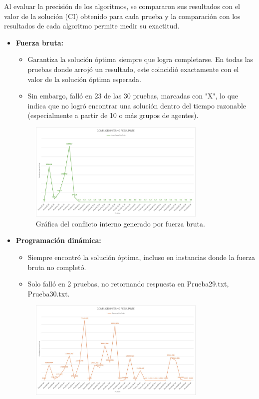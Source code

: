 \documentclass[11pt,letter]{article}
\begin{document}
    Al evaluar la precisión de los algoritmos, se compararon sus resultados con el valor de la solución (CI) obtenido para cada prueba y la comparación con los resultados de cada algoritmo permite medir su exactitud.

    \begin{itemize}
        \item \textbf{Fuerza bruta:}
        \begin{itemize}
            \item Garantiza la solución óptima siempre que logra completarse. En todas las pruebas donde arrojó un resultado, este coincidió exactamente con el valor de la solución óptima esperada.
            \item Sin embargo, falló en 23 de las 30 pruebas, marcadas con "X", lo que indica que no logró encontrar una solución dentro del tiempo razonable (especialmente a partir de 10 o más grupos de agentes).
        \end{itemize}
        \begin{figure}[H]
            \centering
            \includegraphics[width=0.8\textwidth]{resources/conflicto1.jpeg}
            \caption{Gráfica del conflicto interno generado por fuerza bruta.}
        \end{figure}
        \item \textbf{Programación dinámica:}
        \begin{itemize}
            \item Siempre encontró la solución óptima, incluso en instancias donde la fuerza bruta no completó.
            \item Solo falló en 2 pruebas, no retornando respuesta en Prueba29.txt, Prueba30.txt.
        \end{itemize}
        \begin{figure}[H]
            \centering
            \includegraphics[width=0.8\textwidth]{resources/conflicto2.jpeg}

\end{figure}
\end{itemize}
\end{document}
